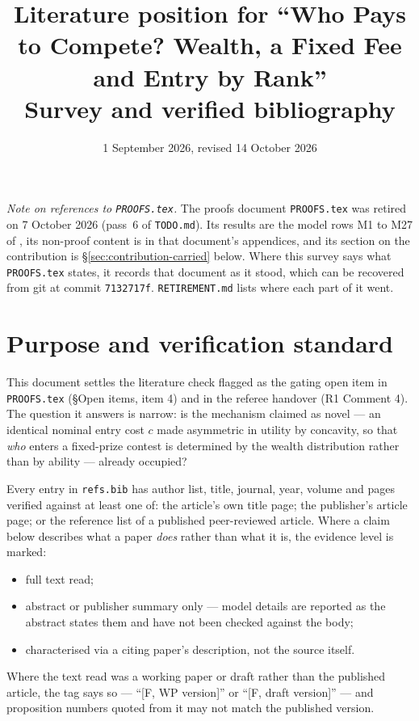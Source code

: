 \documentclass[11pt,a4paper]{article}
\title{Literature position for ``Who Pays to Compete? Wealth, a Fixed Fee and Entry by Rank''\\
\large Survey and verified bibliography}
\author{}
\date{1 September 2026, revised 14 October 2026}
\begin{document}
\maketitle

\noindent\emph{Note on references to \texttt{PROOFS.tex}.} The proofs document
\texttt{PROOFS.tex} was retired on 7 October 2026 (pass~6 of \texttt{TODO.md}).
Its results are the model rows M1 to M27 of , its
non-proof content is in that document's appendices, and its section on the
contribution is \S\ref{sec:contribution-carried} below. Where this survey says
what \texttt{PROOFS.tex} states, it records that document as it stood, which can
be recovered from git at commit \texttt{7132717f}.
\texttt{RETIREMENT.md} lists where each part of it went.

\section{Purpose and verification standard}

This document settles the literature check flagged as the gating open item in
\texttt{PROOFS.tex} (\S Open items, item 4) and in the referee handover
(R1 Comment 4). The question it answers is narrow: is the mechanism claimed
as novel --- an identical nominal entry cost $c$ made asymmetric in utility by
concavity, so that \emph{who} enters a fixed-prize contest is determined by the
wealth distribution rather than by ability --- already occupied?

Every entry in \texttt{refs.bib} has author list, title, journal, year, volume
and pages verified against at least one of: the article's own title page; the
publisher's article page; or the reference list of a published peer-reviewed
article. Where a claim below describes what a paper \emph{does} rather than what
it is, the evidence level is marked:

\begin{itemize}
\item[\textbf{[F]}] full text read;
\item[\textbf{[A]}] abstract or publisher summary only --- model details are
  reported as the abstract states them and have not been checked against the
  body;
\item[\textbf{[C]}] characterised via a citing paper's description, not the
  source itself.
\end{itemize}

Where the text read was a working paper or draft rather than the published
article, the tag says so --- ``[F, WP version]'' or ``[F, draft version]'' ---
and proposition numbers quoted from it may not match the published version.
\end{document}

